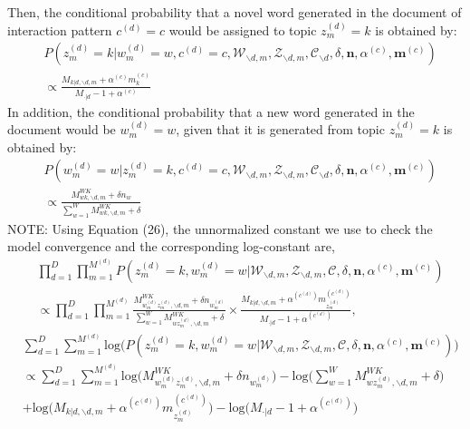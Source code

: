\documentclass[a4paper]{article}
\begin{document}
Then, the conditional probability that a novel word generated in the document of interaction pattern $c^{(d)}=c$  would be assigned to topic $z_m^{(d)}=k$ is obtained by:
 \begin{equation}
 \begin{aligned}
 &P(z^{(d)}_m=k|w^{(d)}_m=w, c^{(d)}=c, \mathcal{W}_{\backslash d, m}, \mathcal{Z}_{\backslash d,m}, \mathcal{C}_{\backslash d}, \delta, \boldsymbol{n}, \alpha^{(c)}, \boldsymbol{m}^{(c)}) \\& \propto
 \frac{M_{k|d, \backslash d, m}+\alpha^{(c)} m^{(c)}_k}{M_{\cdot|d}-1+\alpha^{(c)}}
 \end{aligned}
 \end{equation}
In addition, the conditional probability that a new word generated in the document would be $w_m^{(d)}=w$, given that it is generated from topic $z_m^{(d)}=k$ is obtained by:
\begin{equation}
\begin{aligned}
& P(w^{(d)}_m=w|z^{(d)}_m=k, c^{(d)}=c, \mathcal{W}_{\backslash d, m}, \mathcal{Z}_{\backslash d,m}, \mathcal{C}_{\backslash d}, \delta, \boldsymbol{n}, \alpha^{(c)}, \boldsymbol{m}^{(c)}) \\& \propto 
\frac{M_{wk, \backslash d, m}^{WK}+\delta n_w}{\sum_{w=1}^WM_{wk, \backslash d, m}^{WK}+\delta}
\end{aligned} 
 \end{equation}
 NOTE: Using Equation (26), the unnormalized constant we use to check the model convergence and the corresponding log-constant are,
 \begin{equation}
 	\begin{aligned}
 		& \prod_{d=1}^{D}\prod_{m=1}^{M^{(d)}}  P(z^{(d)}_m=k, w^{(d)}_m=w|\mathcal{W}_{\backslash d, m}, \mathcal{Z}_{\backslash d,m}, \mathcal{C}, \delta, \boldsymbol{n}, \alpha^{(c)}, \boldsymbol{m}^{(c)}) \\ & \propto \prod_{d=1}^{D}\prod_{m=1}^{M^{(d)}} 
 		\frac{M_{w^{(d)}_mz^{(d)}_m, \backslash d, m}^{WK}+\delta n_ {w^{(d)}_m}}{\sum_{w=1}^WM_{wz^{(d)}_m,  \backslash d, m}^{WK}+\delta}\times\frac{M_{k|d, \backslash d, m}+\alpha^{(c^{(d)})} m^{(c^{(d)})}_{z^{(d)}_m}}{M_{\cdot|d}-1+\alpha^{(c^{(d)})}},
 	\end{aligned}
 \end{equation}
  \begin{equation}
  \begin{aligned}
  & \sum_{d=1}^{D}\sum_{m=1}^{M^{(d)}} \mbox{log}\Big( P(z^{(d)}_m=k, w^{(d)}_m=w|\mathcal{W}_{\backslash d, m}, \mathcal{Z}_{\backslash d,m}, \mathcal{C}, \delta, \boldsymbol{n}, \alpha^{(c)}, \boldsymbol{m}^{(c)})\Big) \\ & \propto \sum_{d=1}^{D}\sum_{m=1}^{M^{(d)}} 
  \mbox{log}\Big(M_{w^{(d)}_mz^{(d)}_m, \backslash d, m}^{WK}+\delta n_ {w^{(d)}_m}\Big)-\mbox{log}\Big(\sum_{w=1}^WM_{wz^{(d)}_m,  \backslash d, m}^{WK}+\delta\Big)\\&+\mbox{log}\Big(M_{k|d, \backslash d, m}+\alpha^{(c^{(d)})} m^{(c^{(d)})}_{z^{(d)}_m}\Big)-\mbox{log}\Big(M_{\cdot|d}-1+\alpha^{(c^{(d)})}\Big)
  \end{aligned}
  \end{equation}


\end{document}
